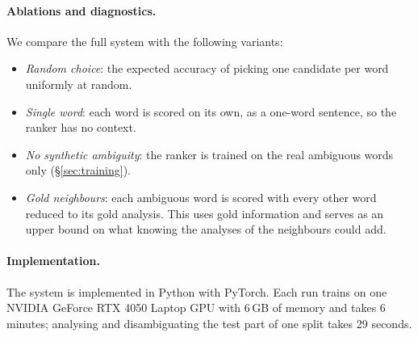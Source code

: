 \paragraph{Ablations and diagnostics.}
We compare the full system with the following variants:
\begin{itemize}
\item \emph{Random choice}: the expected accuracy of picking one candidate per word uniformly at random.
\item \emph{Single word}: each word is scored on its own, as a one-word sentence, so the ranker has no context.
\item \emph{No synthetic ambiguity}: the ranker is trained on the real ambiguous words only (\S\ref{sec:training}).
\item \emph{Gold neighbours}: each ambiguous word is scored with every other word reduced to its gold analysis. This uses gold information and serves as an upper bound on what knowing the analyses of the neighbours could add.
\end{itemize}

\paragraph{Implementation.}
The system is implemented in Python with PyTorch. Each run trains on one NVIDIA GeForce RTX 4050 Laptop GPU with 6\,GB of memory and takes 6 minutes; analysing and disambiguating the test part of one split takes 29 seconds.
